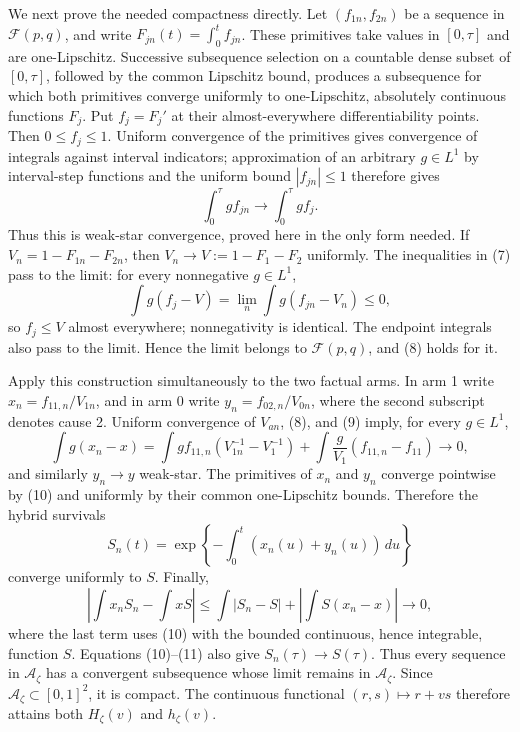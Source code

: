 We next prove the needed compactness directly.  Let \((f_{1n},f_{2n})\) be a sequence in \(\mathcal F(p,q)\), and write \(F_{jn}(t)=\int_0^t f_{jn}\).  These primitives take values in \([0,\tau]\) and are one-Lipschitz.  Successive subsequence selection on a countable dense subset of \([0,\tau]\), followed by the common Lipschitz bound, produces a subsequence for which both primitives converge uniformly to one-Lipschitz, absolutely continuous functions \(F_j\).  Put \(f_j=F_j'\) at their almost-everywhere differentiability points.  Then \(0\le f_j\le1\).  Uniform convergence of the primitives gives convergence of integrals against interval indicators; approximation of an arbitrary \(g\in L^1\) by interval-step functions and the uniform bound \(|f_{jn}|\le1\) therefore gives
\[
 \int_0^\tau g f_{jn}\longrightarrow\int_0^\tau g f_j.   \tag{9}
\]
Thus this is weak-star convergence, proved here in the only form needed.  If \(V_n=1-F_{1n}-F_{2n}\), then \(V_n\to V:=1-F_1-F_2\) uniformly.  The inequalities in (7) pass to the limit: for every nonnegative \(g\in L^1\),
\[
 \int g(f_j-V)=\lim_n\int g(f_{jn}-V_n)\le0,
\]
so \(f_j\le V\) almost everywhere; nonnegativity is identical.  The endpoint integrals also pass to the limit.  Hence the limit belongs to \(\mathcal F(p,q)\), and (8) holds for it.

Apply this construction simultaneously to the two factual arms.  In arm 1 write \(x_n=f_{11,n}/V_{1n}\), and in arm 0 write \(y_n=f_{02,n}/V_{0n}\), where the second subscript denotes cause 2.  Uniform convergence of \(V_{an}\), (8), and (9) imply, for every \(g\in L^1\),
\[
 \int g(x_n-x)
 =\int g f_{11,n}(V_{1n}^{-1}-V_1^{-1})
   +\int \frac{g}{V_1}(f_{11,n}-f_{11})\longrightarrow0,   \tag{10}
\]
and similarly \(y_n\to y\) weak-star.  The primitives of \(x_n\) and \(y_n\) converge pointwise by (10) and uniformly by their common one-Lipschitz bounds.  Therefore the hybrid survivals
\[
 S_n(t)=\exp\!\left\{-\int_0^t(x_n(u)+y_n(u))\,du\right\}
\]
converge uniformly to \(S\).  Finally,
\[
 \left|\int x_nS_n-\int xS\right|
 \le \int|S_n-S|+\left|\int S(x_n-x)\right|\longrightarrow0,  \tag{11}
\]
where the last term uses (10) with the bounded continuous, hence integrable, function \(S\).  Equations (10)--(11) also give \(S_n(\tau)\to S(\tau)\).  Thus every sequence in \(\mathcal A_\zeta\) has a convergent subsequence whose limit remains in \(\mathcal A_\zeta\).  Since \(\mathcal A_\zeta\subset[0,1]^2\), it is compact.  The continuous functional \((r,s)\mapsto r+vs\) therefore attains both \(H_\zeta(v)\) and \(h_\zeta(v)\).

